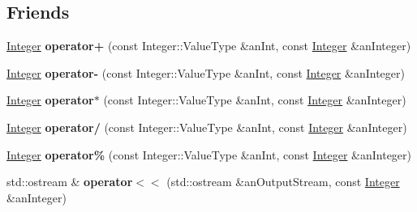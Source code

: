 \subsection*{Friends}
\begin{DoxyCompactItemize}
\item 
\mbox{\label{classlibrary_1_1core_1_1types_1_1_integer_a6fb6698f82f68c6218093d704745ddde}} 
\hyperlink{classlibrary_1_1core_1_1types_1_1_integer}{Integer} {\bfseries operator+} (const Integer\+::\+Value\+Type \&an\+Int, const \hyperlink{classlibrary_1_1core_1_1types_1_1_integer}{Integer} \&an\+Integer)
\item 
\mbox{\label{classlibrary_1_1core_1_1types_1_1_integer_aff6329dcbc1e00c07de3c9dc336cdfdd}} 
\hyperlink{classlibrary_1_1core_1_1types_1_1_integer}{Integer} {\bfseries operator-\/} (const Integer\+::\+Value\+Type \&an\+Int, const \hyperlink{classlibrary_1_1core_1_1types_1_1_integer}{Integer} \&an\+Integer)
\item 
\mbox{\label{classlibrary_1_1core_1_1types_1_1_integer_a410452509c7e5e063f2e4614fe4be5f1}} 
\hyperlink{classlibrary_1_1core_1_1types_1_1_integer}{Integer} {\bfseries operator$\ast$} (const Integer\+::\+Value\+Type \&an\+Int, const \hyperlink{classlibrary_1_1core_1_1types_1_1_integer}{Integer} \&an\+Integer)
\item 
\mbox{\label{classlibrary_1_1core_1_1types_1_1_integer_a61328fcdbfeebf2840a138de4f638789}} 
\hyperlink{classlibrary_1_1core_1_1types_1_1_integer}{Integer} {\bfseries operator/} (const Integer\+::\+Value\+Type \&an\+Int, const \hyperlink{classlibrary_1_1core_1_1types_1_1_integer}{Integer} \&an\+Integer)
\item 
\mbox{\label{classlibrary_1_1core_1_1types_1_1_integer_af4d5e25c08e343c57ca51238b238f962}} 
\hyperlink{classlibrary_1_1core_1_1types_1_1_integer}{Integer} {\bfseries operator\%} (const Integer\+::\+Value\+Type \&an\+Int, const \hyperlink{classlibrary_1_1core_1_1types_1_1_integer}{Integer} \&an\+Integer)
\item 
\mbox{\label{classlibrary_1_1core_1_1types_1_1_integer_aec29fc1731201932ab34cfe2ec83fbc9}} 
std\+::ostream \& {\bfseries operator$<$$<$} (std\+::ostream \&an\+Output\+Stream, const \hyperlink{classlibrary_1_1core_1_1types_1_1_integer}{Integer} \&an\+Integer)
\end{DoxyCompactItemize}


